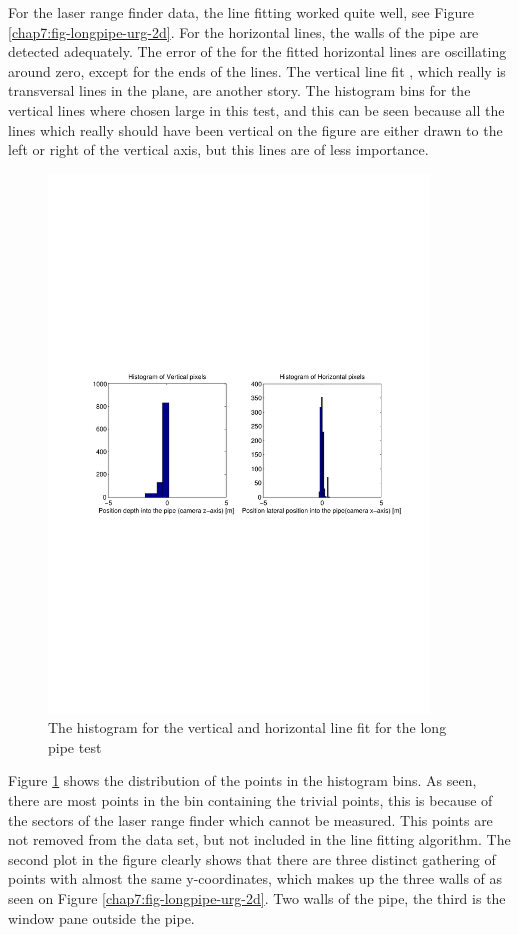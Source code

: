 For the laser range finder data, the line fitting worked quite well, see
Figure \ref{chap7:fig-longpipe-urg-2d}. For the horizontal lines, the walls of the pipe
are detected adequately. The error of the for the fitted horizontal lines are oscillating
around zero, except for the ends of the lines. The vertical line fit , which
really is transversal lines in the plane, are another story. The histogram bins for the
vertical lines where chosen large in this test, and this can be seen because all the lines
which really should have been vertical on the figure are either drawn to the left or right
of the vertical axis, but this lines are of less importance. 


\begin{figure}[htbp]
    \centering
    \includegraphics[width=0.9\textwidth]{pics/longpipe-urg-hist}
    \caption{The histogram for the vertical and horizontal line fit for the long pipe test}
    \label{chap8:fig-longpipe-urg-hist}
\end{figure}
Figure \ref{chap8:fig-longpipe-urg-hist} shows the distribution of the points in the
histogram bins. As seen, there are most points in the bin containing the trivial points, this is
because of the sectors of the laser range finder which cannot be measured. This points are
not removed from the data set, but not included in the line fitting algorithm. 
The second plot in the figure clearly shows that there are three distinct gathering of
points with almost the same y-coordinates, which makes up the three walls of as seen on
Figure \ref{chap7:fig-longpipe-urg-2d}. Two walls of the pipe, the third is the window
pane outside the pipe. 

